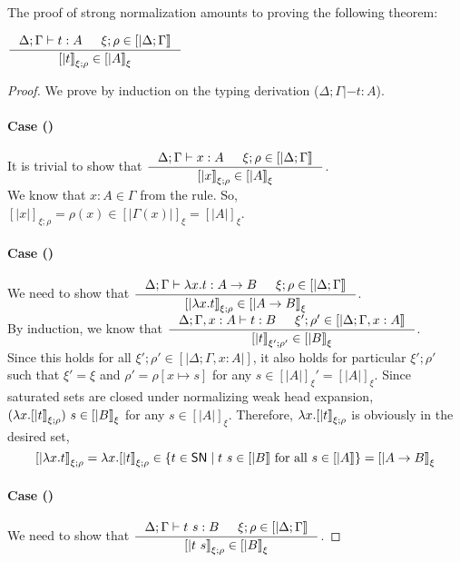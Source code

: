 The proof of strong normalization amounts to proving the following theorem:
\begin{theorem}
$ \inference{\Delta;\Gamma|- t:A & \xi;\rho \in [|\Delta;\Gamma|]}
            {[|t|]_{\xi;\rho} \in [|A|]_\xi} $
\end{theorem}
\begin{proof}
We prove by induction on the typing derivation ($\Delta;\Gamma|- t:A$).
\paragraph{Case ()}
It is trivial to show that
$ \inference{\Delta;\Gamma |- x:A & \xi;\rho \in [|\Delta;\Gamma|]}
        {[|x|]_{\xi;\rho} \in [|A|]_\xi} $.
\vspace{.2em}\\
We know that $x:A \in \Gamma$ from the  rule.
So, $[|x|]_{\xi;\rho} =\rho(x)\in[|\Gamma(x)|]_\xi = [|A|]_\xi$.

\paragraph{Case ()}
We need to show that
$ \inference{\Delta;\Gamma |- \l x.t : A -> B & \xi;\rho \in [|\Delta;\Gamma|]}
        {[|\l x.t|]_{\xi;\rho} \in [|A -> B|]_\xi} $.
\vspace{.3em}\\
By induction, we know that
$ \inference{\Delta;\Gamma,x:A |- t : B & \xi';\rho' \in [|\Delta;\Gamma,x:A|]}
             {[|t|]_{\xi';\rho'} \in [|B|]_\xi} $.
\vspace{.3em}\\
Since this holds for all $\xi';\rho' \in [|\Delta;\Gamma,x:A|]$, it also holds
for particular $\xi';\rho'$ such that $\xi'=\xi$ and
$\rho' = \rho[x \mapsto s]$ for any $s \in [|A|]_\xi' = [|A|]_\xi$.
Since saturated sets are closed under normalizing weak head expansion,
$(\lambda x.[|t|]_{\xi;\rho})~s \in[|B|]_\xi$ for any $s\in[|A|]_\xi$.
Therefore, $\lambda x.[|t|]_{\xi;\rho}$ is obviously in the desired set,
\[ [|\lambda x.t|]_{\xi;\rho} = \lambda x.[|t|]_{\xi;\rho}
   \in \{t\in \mathsf{SN} \mid t~s\in[|B|] ~\text{for all}~ s\in[|A|]\} 
 = [|A -> B|]_\xi \]

\paragraph{Case ()}
We need to show that
$ \inference{\Delta;\Gamma |- t~s : B & \xi;\rho\in[|\Delta;\Gamma|]}{[|t~s|]_{\xi;\rho} \in [|B|]_\xi} $.


\end{proof}
